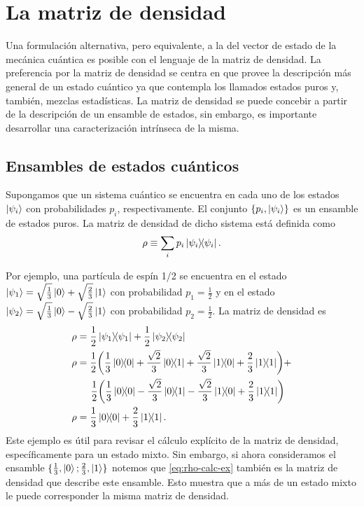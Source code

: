 \chapter{La matriz de densidad} %
Una formulación alternativa, pero equivalente, a la del vector de estado 
de la mecánica cuántica es posible con el lenguaje de la matriz de densidad. 
La preferencia por la matriz de densidad se centra en que provee la descripción
más general de un estado cuántico ya que contempla los llamados estados puros y,
también, mezclas estadísticas. La matriz de densidad se puede concebir 
a partir de la descripción de un ensamble de estados, sin embargo, es importante
desarrollar una caracterización intrínseca de la misma. 

\section{Ensambles de estados cuánticos} %
Supongamos que un sistema cuántico se encuentra en cada uno de los estados 
$\ket{\psi _i}$ con probabilidades $p_i$, respectivamente. El conjunto 
$\{p_i,\ket{\psi _i} \}$ es un ensamble de estados puros. La matriz de 
densidad de dicho sistema está definida como
\begin{equation}
	\rho \equiv \sum _i p_i\dyad{\psi_i}{\psi_i}.
	\label{eq:rho_def}
\end{equation}

Por ejemplo, una partícula de espín 1/2 se encuentra en el estado 
$\ket{\psi_1}=\sqrt{\frac{1}{3}}\ket{0} + \sqrt{\frac{2}{3}}\ket{1}$
con probabilidad $p_1=\frac{1}{2}$ y en el estado 
$\ket{\psi_2}=\sqrt{\frac{1}{3}}\ket{0} - \sqrt{\frac{2}{3}}\ket{1}$
con probabilidad $p_2=\frac{1}{2}$. La matriz de densidad es
\begin{align}
	\rho 	&= \frac{1}{2}\dyad{\psi_1}{\psi_1} + 
	\frac{1}{2}\dyad{\psi_2}{\psi_2} \nonumber \\
	\rho	&= \frac{1}{2}\qty(\frac{1}{3}\dyad{0}{0} +
					 \frac{\sqrt{2}}{3}\dyad{0}{1} + 
					 \frac{\sqrt{2}}{3}\dyad{1}{0} +
					 \frac{2}{3}\dyad{1}{1}) + \nonumber \\
				&\hspace{5mm} \frac{1}{2}\qty(\frac{1}{3}\dyad{0}{0} -
					 \frac{\sqrt{2}}{3}\dyad{0}{1} -
					 \frac{\sqrt{2}}{3}\dyad{1}{0} +
					 \frac{2}{3}\dyad{1}{1}) \nonumber \\
	\rho	&= \frac{1}{3}\dyad{0}{0} + \frac{2}{3}\dyad{1}{1}. 
	\label{eq:rho-calc-ex}
\end{align}
Este ejemplo es útil para revisar el cálculo explícito de
la matriz de densidad, específicamente para un estado mixto. Sin
embargo, si ahora consideramos el ensamble $\{ \frac{1}{3}, \ket{0};
\frac{2}{3}, \ket{1} \}$ notemos que \eqref{eq:rho-calc-ex} también es la
matriz de densidad que describe este ensamble. Esto muestra que a más de un
estado mixto le puede corresponder la misma matriz de densidad.\newline

